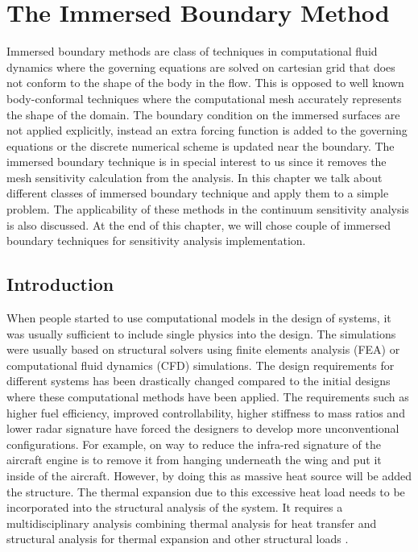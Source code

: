 \chapter{The Immersed Boundary Method}
Immersed boundary methods are class of techniques in computational fluid dynamics where the governing equations are solved on cartesian grid that does not conform to the shape of the body in the flow. This is opposed to well known body-conformal techniques where the computational mesh accurately represents the shape of the domain. The boundary condition on the immersed surfaces are not applied explicitly, instead an extra forcing function is added to the governing equations or the discrete numerical scheme is updated near the boundary. The immersed boundary technique is in special interest to us since it removes the mesh sensitivity calculation from the analysis. In this chapter we talk about different classes of immersed boundary technique and apply them to a simple problem. The applicability of these methods in the continuum sensitivity analysis is also discussed. At the end of this chapter, we will chose couple of immersed boundary techniques for sensitivity analysis implementation.

\section{Introduction}
When people started to use computational models in the design of systems, it was usually sufficient to include single physics into the design. The simulations were usually based on structural solvers using finite elements analysis (FEA) or computational fluid dynamics (CFD) simulations. The design requirements for different systems has been drastically changed compared to the initial designs where these computational methods have been applied. The requirements such as higher fuel efficiency, improved controllability, higher stiffness to mass ratios and lower radar signature have forced the designers to develop more unconventional configurations. For example, on way to reduce the infra-red signature of the aircraft engine is to remove it from hanging underneath the wing and put it inside of the aircraft. However, by doing this as massive heat source will be added the structure. The thermal expansion due to this excessive heat load needs to be incorporated into the structural analysis of the system. It requires a multidisciplinary analysis combining thermal analysis for heat transfer and structural analysis for thermal expansion and other structural loads \cite{deaton2013stiffening}.

